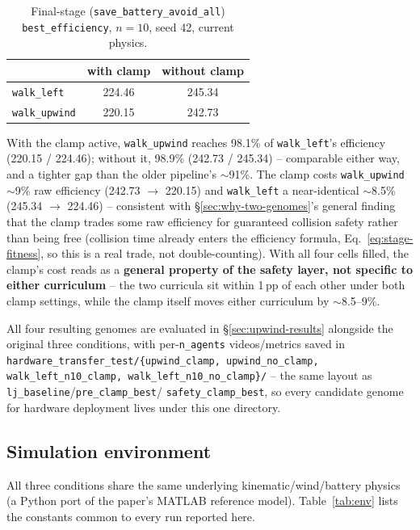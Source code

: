 \documentclass[11pt]{article}
\begin{document}
\begin{table}[h]
\centering
\caption{Final-stage (\texttt{save\_battery\_avoid\_all}) \texttt{best\_efficiency}, $n{=}10$, seed 42, current physics.}
\label{tab:upwind-ablation}
\begin{tabular}{@{}lcc@{}}
\toprule
 & with clamp & without clamp \\
\midrule
\texttt{walk\_left} & 224.46 & 245.34 \\
\texttt{walk\_upwind} & 220.15 & 242.73 \\
\bottomrule
\end{tabular}
\end{table}

\noindent With the clamp active, \texttt{walk\_upwind} reaches 98.1\% of \texttt{walk\_left}'s
efficiency (220.15 / 224.46); without it, 98.9\% (242.73 / 245.34) -- comparable either way,
and a tighter gap than the older pipeline's $\sim$91\%. The clamp costs \texttt{walk\_upwind}
$\sim$9\% raw efficiency (242.73 $\to$ 220.15) and \texttt{walk\_left} a near-identical
$\sim$8.5\% (245.34 $\to$ 224.46) -- consistent with \S\ref{sec:why-two-genomes}'s general
finding that the clamp trades some raw efficiency for guaranteed collision safety rather than
being free (collision time already enters the efficiency formula, Eq.~\ref{eq:stage-fitness},
so this is a real trade, not double-counting). With all four cells filled, the clamp's cost
reads as a \textbf{general property of the safety layer, not specific to either curriculum} --
the two curricula sit within 1\,pp of each other under both clamp settings, while the clamp
itself moves either curriculum by $\sim$8.5--9\%.

All four resulting genomes are evaluated in \S\ref{sec:upwind-results} alongside the original
three conditions, with per-\texttt{n\_agents} videos/metrics saved in
\texttt{hardware\_transfer\_test/\{upwind\_clamp, upwind\_no\_clamp, walk\_left\_n10\_clamp,
walk\_left\_n10\_no\_clamp\}/} -- the same layout as \texttt{lj\_baseline}/\texttt{pre\_clamp\_best}/
\texttt{safety\_clamp\_best}, so every candidate genome for hardware deployment lives under
this one directory.

\subsection{Simulation environment}
\label{sec:env}
All three conditions share the same underlying kinematic/wind/battery physics (a Python port
of the paper's MATLAB reference model). Table~\ref{tab:env} lists the constants common to
every run reported here.
\end{document}
